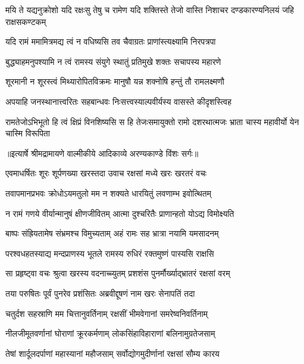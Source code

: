 \threelineshloka
{मयि ते यद्यनुक्रोशो यदि रक्षःसु तेषु च}
{रामेण यदि शक्तिस्ते तेजो वास्ति निशाचर}
{दण्डकारण्यनिलयं जहि राक्षसकण्टकम्} %

\twolineshloka
{यदि रामं ममामित्रमद्य त्वं न वधिष्यसि}
{तव चैवाग्रतः प्राणांस्त्यक्ष्यामि निरपत्रपा} %

\twolineshloka
{बुद्ध्याहमनुपश्यामि न त्वं रामस्य संयुगे}
{स्थातुं प्रतिमुखे शक्तः सचापस्य महारणे} %

\twolineshloka
{शूरमानी न शूरस्त्वं मिथ्यारोपितविक्रमः}
{मानुषौ यन्न शक्नोषि हन्तुं तौ रामलक्ष्मणौ} %

\twolineshloka
{अपयाहि जनस्थानात्त्वरितः सहबान्धवः}
{निःसत्त्वस्याल्पवीर्यस्य वासस्ते कीदृशस्त्विह} %

\threelineshloka
{रामतेजोऽभिभूतो हि त्वं क्षिप्रं विनशिष्यसि}
{स हि तेजःसमायुक्तो रामो दशरथात्मजः}
{भ्राता चास्य महावीर्यो येन चास्मि विरूपिता} %


{॥इत्यार्षे श्रीमद्रामायणे वाल्मीकीये आदिकाव्ये अरण्यकाण्डे विंशः सर्गः॥}


\twolineshloka
{एवमाधर्षितः शूरः शूर्पणख्या खरस्तदा}
{उवाच रक्षसां मध्ये खरः खरतरं वचः} %

\twolineshloka
{तवापमानप्रभवः क्रोधोऽयमतुलो मम}
{न शक्यते धारयितुं लवणाम्भ इवोत्थितम्} %

\twolineshloka
{न रामं गणये वीर्यान्मानुषं क्षीणजीवितम्}
{आत्मा दुश्चरितैः प्राणान्हतो योऽद्य विमोक्ष्यति} %

\twolineshloka
{बाष्पः संह्रियतामेष संभ्रमश्च विमुच्यताम्}
{अहं रामः सह भ्रात्रा नयामि यमसादनम्} %

\twolineshloka
{परश्वधहतस्याद्य मन्दप्राणस्य भूतले}
{रामस्य रुधिरं रक्तमुष्णं पास्यसि राक्षसि} %

\twolineshloka
{सा प्रहृष्ट्वा वचः श्रुत्वा खरस्य वदनाच्च्युतम्}
{प्रशशंस पुनर्मौर्ख्याद्भ्रातरं रक्षसां वरम्} %

\twolineshloka
{तया परुषितः पूर्वं पुनरेव प्रशंसितः}
{अब्रवीद्दूषणं नाम खरः सेनापतिं तदा} %

\twolineshloka
{चतुर्दश सहस्राणि मम चित्तानुवर्तिनाम्}
{रक्षसीं भीमवेगानां समरेष्वनिवर्तिनाम्} %

\twolineshloka
{नीलजीमूतवर्णानां घोराणां क्रूरकर्मणाम्}
{लोकसिंहाविहाराणां बलिनामुग्रतेजसाम्} %

\twolineshloka
{तेषां शार्दूलदर्पाणां महास्यानां महौजसाम्}
{सर्वोद्योगमुदीर्णानां रक्षसां सौम्य कारय} %

